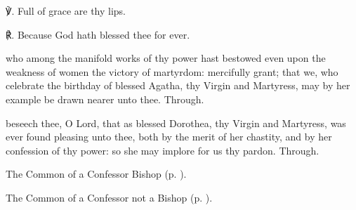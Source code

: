 ℣. Full of grace are thy lips.

℟. Because God hath blessed thee for ever.


\collect
{} who among the manifold works of thy power hast bestowed even upon the weakness of women the victory of martyrdom: mercifully grant; that we, who celebrate the birthday of blessed Agatha, thy Virgin and Martyress, may by her example be drawn nearer unto thee. Through.




\memorialCollect
{} beseech thee, O Lord, that as blessed Dorothea, thy Virgin and Martyress, was ever found pleasing unto thee, both by the merit of her chastity, and by her confession of thy power: so she may implore for us thy pardon. Through.



\begin{rubric}
	The Common of a Confessor Bishop (p. \pageref{ConfessorBishopCollect}).
\end{rubric}



\begin{rubric}
	The Common of a Confessor not a Bishop (p. \pageref{AbbotCollect}).
\end{rubric}




